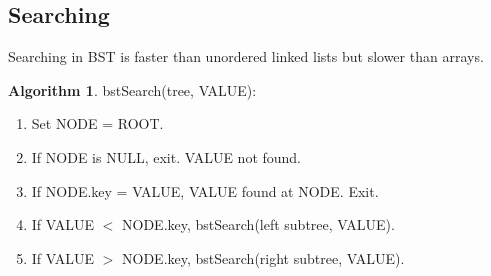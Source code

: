 \documentclass[10pt, a4paper]{extarticle}
\theoremstyle{definition}
\newtheorem{alg}{Algorithm}
\begin{document}
	\subsection{Searching}
	Searching in BST is faster than unordered linked lists but slower than arrays.\\
	\begin{alg}
	bstSearch(tree, VALUE):
	\begin{enumerate}
		\item Set NODE = ROOT.
		\item If NODE is NULL, exit. VALUE not found.
		\item If NODE.key = VALUE, VALUE found at NODE. Exit.
		\item If VALUE $<$ NODE.key, bstSearch(left subtree, VALUE).
		\item If VALUE $>$ NODE.key, bstSearch(right subtree, VALUE).
\end{enumerate}
	\end{alg}
\end{document}
